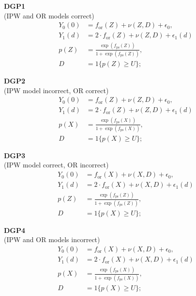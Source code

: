\begin{multicols}{2}

\textbf{DGP1} \\
\small (IPW and OR models correct)
\begin{align*}
    Y_0(0) &= f_{\text{or}}(Z) + \nu(Z, D) + \epsilon_0, \\
    Y_1(d) &= 2 \cdot f_{\text{or}}(Z) + \nu(Z, D) + \epsilon_1(d) \\
    p(Z) &= \frac{\exp \left( f_{\text{ps}}(Z) \right)}{1 + \exp \left( f_{\text{ps}}(Z) \right)}, \\
    D &= 1\{ p(Z) \geq U \};
\end{align*}

\textbf{DGP2}\\
\small (IPW model incorrect, OR correct)
\begin{align*}
    Y_0(0) &= f_{\text{or}}(Z) + \nu(Z, D) + \epsilon_0, \\
    Y_1(d) &= 2 \cdot f_{\text{or}}(Z) + \nu(Z, D) + \epsilon_1(d) \\
    p(X) &= \frac{\exp \left( f_{\text{ps}}(X) \right)}{1 + \exp \left( f_{\text{ps}}(X) \right)}, \\
    D &= 1\{ p(X) \geq U \};
\end{align*}

\columnbreak

\textbf{DGP3}\\
\small (IPW model correct, OR incorrect)
\begin{align*}
    Y_0(0) &= f_{\text{or}}(X) + \nu(X, D) + \epsilon_0, \\
    Y_1(d) &= 2 \cdot f_{\text{or}}(X) + \nu(X, D) + \epsilon_1(d) \\
    p(Z) &= \frac{\exp \left( f_{\text{ps}}(Z) \right)}{1 + \exp \left( f_{\text{ps}}(Z) \right)}, \\
    D &= 1\{ p(X) \geq U \};
\end{align*}

\textbf{DGP4 } \\
\small (IPW and OR models incorrect)
\begin{align*}
    Y_0(0) &= f_{\text{or}}(X) + \nu(X, D) + \epsilon_0, \\
    Y_1(d) &= 2 \cdot f_{\text{or}}(X) + \nu(X, D) + \epsilon_1(d) \\
    p(X) &= \frac{\exp \left( f_{\text{ps}}(X) \right)}{1 + \exp \left( f_{\text{ps}}(X) \right)}, \\
    D &= 1\{ p(X) \geq U \};
\end{align*}

\end{multicols}

